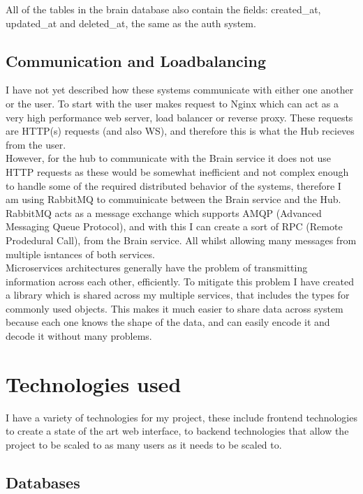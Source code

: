 \documentclass[titlepage]{article}
\begin{document}
All of the tables in the brain database also contain the fields: created\_at, updated\_at and deleted\_at, the same as the auth system.

\subsection{Communication and Loadbalancing}
I have not yet described how these systems communicate with either one another or the user. To start with the user makes request to Nginx which can act as a very high performance web server, load balancer or reverse proxy. These requests are HTTP(s) requests (and also WS), and therefore this is what the Hub recieves from the user. \\

However, for the hub to communicate with the Brain service it does not use HTTP requests as these would be somewhat inefficient and not complex enough to handle some of the required distributed behavior of the systems, therefore I am using RabbitMQ to commuinicate between the Brain service and the Hub. RabbitMQ acts as a message exchange which supports AMQP (Advanced Messaging Queue Protocol), and with this I can create a sort of RPC (Remote Prodedural Call), from the Brain service. All whilst allowing many messages from multiple isntances of both services. \\

Microservices architectures generally have the problem of transmitting information across each other, efficiently. To mitigate this problem I have created a library which is shared across my multiple services, that includes the types for commonly used objects. This makes it much easier to share data across system because each one knows the shape of the data, and can easily encode it and decode it without many problems.


\section{Technologies used}
I have a variety of technologies for my project, these include frontend technologies to create a state of the art web interface, to backend technologies that allow the project to be scaled to as many users as it needs to be scaled to. \\

\subsection{Databases}
\end{document}
